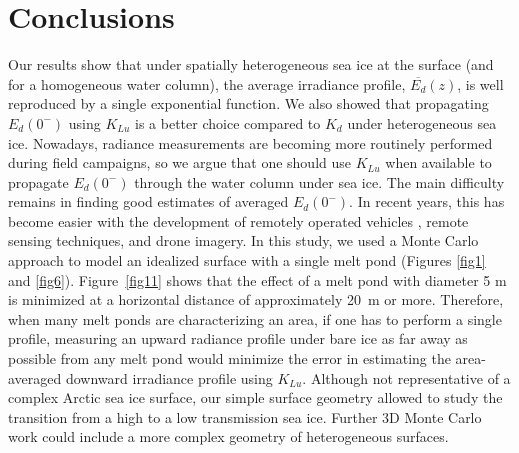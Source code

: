 \documentclass[applsci,article,accept,moreauthors,pdftex,10pt,a4paper]{Definitions/mdpi}
\newcommand{\ked}{\ensuremath{K_{d}}}
\newcommand{\klu}{\ensuremath{K_{Lu}}}
\newcommand{\edzero}{\ensuremath{{E_d(0^-)}}}
\newcommand{\meanedz}{\ensuremath{{\overline{E_d}(z)}}}
\begin{document}
%
\section{Conclusions}

Our results show that under spatially heterogeneous sea ice at the surface (and for a homogeneous water column), the average irradiance profile, \meanedz{}, is well reproduced by a single exponential function. We also showed that propagating \edzero{} using \klu{} is a better choice compared to \ked{} under heterogeneous sea ice. Nowadays, radiance measurements are becoming more routinely performed during field campaigns, so we argue that one should use \klu{} when available to propagate \edzero{} through the water column under sea ice. The main difficulty remains in finding good estimates of averaged \edzero{}. In recent years, this has become easier with the development of remotely operated vehicles \citep{Katlein2015, Arndt2017, Nicolaus2013}, remote sensing techniques, and drone imagery. In this study, we used a Monte Carlo approach to model an idealized surface with a single melt pond (Figures \ref{fig1} and \ref{fig6}). Figure~\ref{fig11} shows that the effect of a melt pond with diameter 5 m is minimized at a horizontal distance of approximately 20~m or more. Therefore, when many melt ponds are characterizing an area, if one has to perform a single profile, measuring an upward radiance profile under bare ice as far away as possible from any melt pond would minimize the error in estimating the area-averaged downward irradiance profile using \klu{}. Although not representative of a complex Arctic sea ice surface, our simple surface geometry allowed to study the transition from a high to a low transmission sea ice. Further 3D Monte Carlo work could include a more complex geometry of heterogeneous surfaces.
%

\vspace{6pt}
\end{document}
